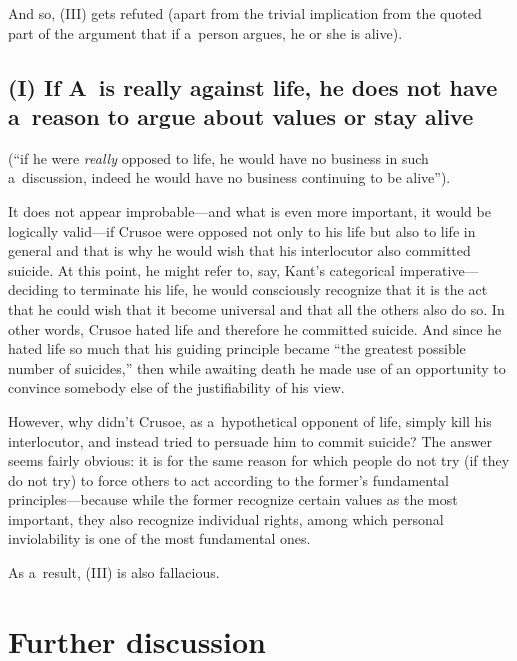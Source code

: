 And so, (III) gets refuted (apart from the trivial implication from the quoted part of the argument that if a~person argues, he or she is alive).



\subsection{ (I) If A~is really against life, he does not have a~reason to argue about values or stay alive }



(``if he were \textit{really} opposed to life, he would have no business in such a~discussion, indeed he would have no business continuing to be alive'').



It does not appear improbable---and what is even more important, it would be logically valid---if Crusoe were opposed not only to his life but also to life in general and that is why he would wish that his interlocutor also committed suicide. At this point, he might refer to, say, Kant's categorical imperative---deciding to terminate his life, he would consciously recognize that it is the act that he could wish that it become universal and that all the others also do so. In other words, Crusoe hated life and therefore he committed suicide. And since he hated life so much that his guiding principle became ``the greatest possible number of suicides,'' then while awaiting death he made use of an opportunity to convince somebody else of the justifiability of his view.



However, why didn't Crusoe, as a~hypothetical opponent of life, simply kill his interlocutor, and instead tried to persuade him to commit suicide? The answer seems fairly obvious: it is for the same reason for which people do not try (if they do not try) to force others to act according to the former's fundamental principles---because while the former recognize certain values as the most important, they also recognize individual rights, among which personal inviolability is one of the most fundamental ones.



As a~result, (III) is also fallacious.



\section{Further discussion}

